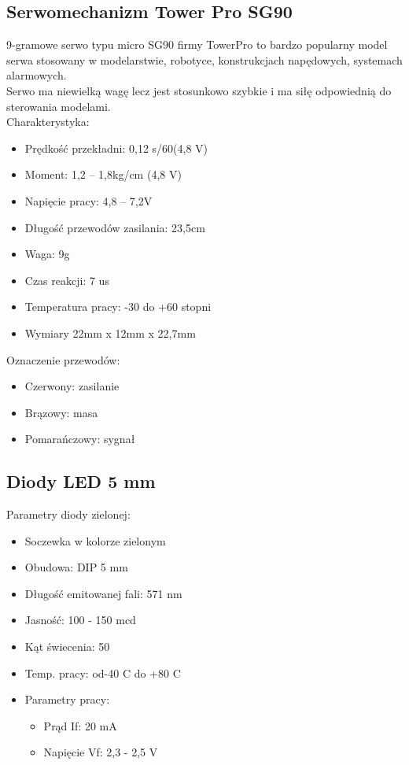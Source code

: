 \documentclass{classrep}
\begin{document}
\subsection {Serwomechanizm Tower Pro SG90}
9-gramowe serwo typu micro SG90 firmy TowerPro to bardzo popularny model serwa stosowany w modelarstwie, robotyce, konstrukcjach napędowych, systemach alarmowych.\\

Serwo ma niewielką wagę lecz jest stosunkowo szybkie i ma siłę odpowiednią do sterowania modelami.\\

Charakterystyka:
\begin{itemize}
  \item Prędkość przekładni: 0,12 s/60\degree (4,8 V)
  \item Moment: 1,2 – 1,8kg/cm (4,8 V)
  \item Napięcie pracy: 4,8 – 7,2V
  \item Długość przewodów zasilania: 23,5cm
  \item Waga: 9g
  \item Czas reakcji: 7 us
  \item Temperatura pracy: -30 do +60 stopni
  \item Wymiary 22mm x 12mm x 22,7mm\\
\end{itemize}

Oznaczenie przewodów:
\begin{itemize}
  \item Czerwony: zasilanie
  \item Brązowy: masa
  \item Pomarańczowy: sygnał
\end{itemize}

\subsection {Diody LED 5 mm}
Parametry diody zielonej:
\begin{itemize}
  \item Soczewka w kolorze zielonym
  \item Obudowa: DIP 5 mm
  \item Długość emitowanej fali: 571 nm
  \item Jasność: 100 - 150 mcd
  \item Kąt świecenia: 50\degree
  \item Temp. pracy: od-40 \degree C do +80 \degree C
  \item Parametry pracy:
\begin{itemize}
  \item Prąd If: 20 mA
  \item Napięcie Vf: 2,3 - 2,5 V\\
\end{itemize}
\end{itemize}
\end{document}
